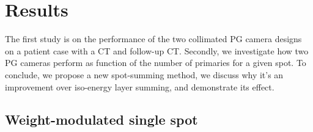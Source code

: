 \documentclass[a4paper,english]{article}
\begin{document}
\section{Results}

The first study is on the performance of the two collimated PG camera designs on a patient case with a CT and follow-up CT. Secondly, we investigate how two PG cameras perform as function of the number of primaries for a given spot. To conclude, we propose a new spot-summing method, we discuss why it's an improvement over iso-energy layer summing, and demonstrate its effect.



\subsection{Weight-modulated single spot}



\end{document}
